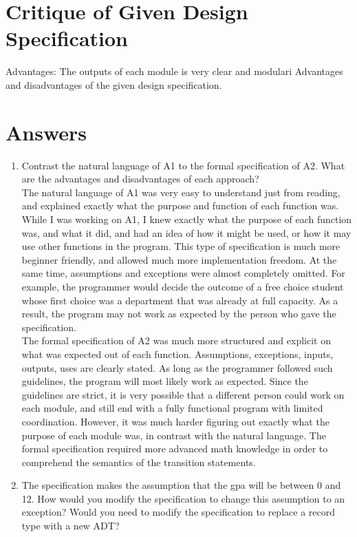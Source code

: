 \documentclass[12pt]{article}
\begin{document}
\section{Critique of Given Design Specification}

Advantages: The outputs of each module is very clear and modulari
Advantages and disadvantages of the given design specification.

\section{Answers}

\begin{enumerate}[label=\alph*]
\item Contrast the natural language of A1 to the formal specification of A2. What are the advantages and disadvantages of each approach? \\ 

The natural language of A1 was very easy to understand just from reading, and explained exactly what the purpose and function of each function was. While I was working on A1, I knew exactly what the purpose of each function was, and what it did, and had an idea of how it might be used, or how it may use other functions in the program. This type of specification is much more beginner friendly, and allowed much more implementation freedom. At the same time, assumptions and exceptions were almost completely omitted. For example, the programmer would decide the outcome of a free choice student whose first choice was a department that was already at full capacity. As a result, the program may not work as expected by the person who gave the specification. \\ 

The formal specification of A2 was much more structured and explicit on what was expected out of each function. Assumptions, exceptions, inputs, outputs, uses are clearly stated. As long as the programmer followed such guidelines, the program will most likely work as expected. Since the guidelines are strict, it is very possible that a different person could work on each module, and still end with a fully functional program with limited coordination. However, it was much harder figuring out exactly what the purpose of each module was, in contrast with the natural language. The formal specification required more advanced math knowledge in order to comprehend the semantics of the transition statements.

\item The specification makes the assumption that the gpa will be between 0 and 12. How would you modify the specification to change this assumption to an exception? Would you need to modify the specification to replace a record type with a new ADT? \\ 


\end{enumerate}
\end{document}
